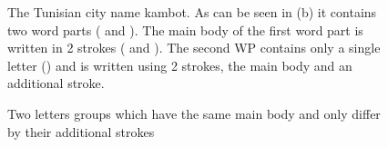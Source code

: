 \documentclass[12pt,journal,compsoc]{IEEEtran}
\begin{document}
\begin{figure}[h]
     \begin{center}
    \end{center}
    \caption{
        The Tunisian city name kambot. As can be seen in (b) it contains two word parts ( and  ). The main body of the first word part is written in 2 strokes ( and ). The second WP contains only a single letter () and is written using 2 strokes, the main body and an additional stroke.   
     }
   \label{fig:kmbot}
\end{figure}

\begin{figure}[h]
     \begin{center}
    \end{center}
    \caption{
        Two letters groups which have the same main body and only differ by their additional strokes
     }
   \label{fig:same_main_body_letters}
\end{figure}
\end{document}
